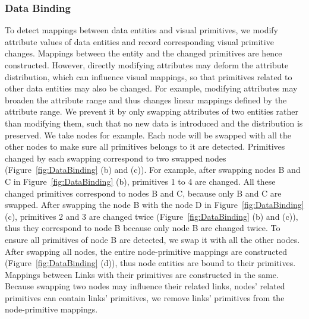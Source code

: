 \subsubsection{Data Binding} \label{sec:databinding}
To detect mappings between data entities and visual primitives, 
we modify attribute values of data entities and record corresponding visual primitive changes.
Mappings between the entity and the changed primitives are hence constructed.
However, directly modifying attributes may deform the attribute distribution, which can influence visual mappings, so that primitives related to other data entities may also be changed.
For example, modifying attributes may broaden the attribute range and thus changes linear mappings defined by the attribute range.
We prevent it by only swapping attributes of two entities rather than modifying them, such that no new data is introduced and the distribution is preserved.
We take nodes for example.
Each node will be swapped with all the other nodes to make sure all primitives belongs to it are detected.
Primitives changed by each swapping correspond to two swapped nodes (Figure~\ref{fig:DataBinding} (b) and (c)).
For example, after swapping nodes B and C in Figure~\ref{fig:DataBinding} (b), primitives 1 to 4 are changed.
All these changed primitives correspond to nodes B and C, because only B and C are swapped.
After swapping the node B with the node D in Figure~\ref{fig:DataBinding} (c), primitives 2 and 3 are changed twice (Figure~\ref{fig:DataBinding} (b) and (c)), thus they correspond to node B because only node B are changed twice.
To ensure all primitives of node B are detected, we swap it with all the other nodes.
After swapping all nodes, the entire node-primitive mappings are constructed (Figure~\ref{fig:DataBinding} (d)), thus node entities are bound to their primitives.
Mappings between Links with their primitives are constructed in the same.
Because swapping two nodes may influence their related links, nodes' related primitives can contain links' primitives,
we remove links' primitives from the node-primitive mappings.

